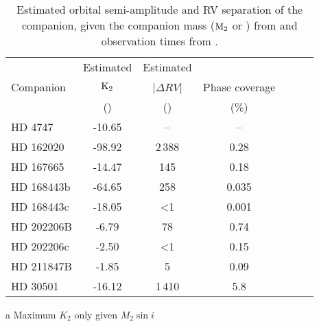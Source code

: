 \begin{table*}
    \small
    \centering
    \begin{threeparttable}[b]
        \caption{Estimated orbital semi-amplitude and {RV} separation of the companion, given the companion mass (\(\textrm{M}_{2}\) or \mtwosini{}) from  and observation times from .}
        \begin{tabular}{l c c c c c c}%
            \toprule
             & Estimated & Estimated & & \\  %
             Companion & \(\rm K_2\) & |\(\Delta {RV}\)| & Phase coverage\\
             & (\kmps{}) & (\mps{}) & (\%)\\
             \midrule
             {HD 4747} & -10.65 & -- & --\\  %
             {HD 162020} & -98.92\tnote{a} & 2\,388 & 0.28\\  %
             {HD 167665} & -14.47\tnote{a} & 145 & 0.18\\  %
             {HD 168443b} & -64.65\tnote{a} & 258 & 0.035\\
             {HD 168443c} & -18.05\tnote{a} & <1 & 0.001\\  %
             {HD 202206}B & -6.79 & 78 & 0.74\\  %
             {HD 202206}c & -2.50 & <1 & 0.15\\  %
             {HD 211847}B & -1.85 & 5 & 0.09\\  %
             {HD 30501} & -16.12 & 1\,410 & 5.8\\
             \bottomrule
         \end{tabular}\label{tab:estimated_rv}
         \begin{tablenotes}
            \item[a] {Maximum \(K_2\) only given \(M_2 \sin{i}\)}
         \end{tablenotes}
    \end{threeparttable}
\end{table*}
